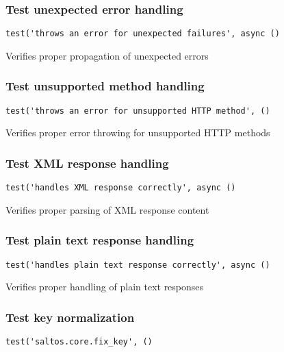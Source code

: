 \documentclass[a4paper]{article}
\begin{document}
\hypertarget{toc515}{}
\subsubsection{Test unexpected error handling}

\begin{lstlisting}
test('throws an error for unexpected failures', async ()
\end{lstlisting}

Verifies proper propagation of unexpected errors

\hypertarget{toc516}{}
\subsubsection{Test unsupported method handling}

\begin{lstlisting}
test('throws an error for unsupported HTTP method', ()
\end{lstlisting}

Verifies proper error throwing for unsupported HTTP methods

\hypertarget{toc517}{}
\subsubsection{Test XML response handling}

\begin{lstlisting}
test('handles XML response correctly', async ()
\end{lstlisting}

Verifies proper parsing of XML response content

\hypertarget{toc518}{}
\subsubsection{Test plain text response handling}

\begin{lstlisting}
test('handles plain text response correctly', async ()
\end{lstlisting}

Verifies proper handling of plain text responses

\hypertarget{toc519}{}
\subsubsection{Test key normalization}

\begin{lstlisting}
test('saltos.core.fix_key', ()
\end{lstlisting}
\end{document}
